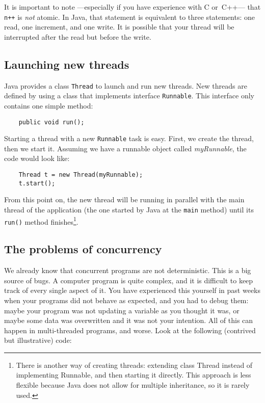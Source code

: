 It is important to note ---especially if you have experience with C
or~C++--- that \verb_n++_ is \emph{not} atomic. In Java, that
statement is equivalent to three statements: one read, one increment,
and one write. It is possible that your thread will be interrupted
after the read but before the write. 

\subsection{Launching new threads}
\label{sec:launch-new-thre}

Java provides a class \verb+Thread+ to launch and run new threads. New
threads are defined by using a class that implements interface
\verb+Runnable+. This interface only contains one simple method: 

\begin{verbatim}
    public void run();
\end{verbatim}

Starting a thread with a new \verb+Runnable+ task is easy. First, we
create the thread, then we start it. Assuming we have a runnable
object called \emph{myRunnable}, the code would look like:

\begin{verbatim}
    Thread t = new Thread(myRunnable);
    t.start();
\end{verbatim}

From this point on, the new thread will be running in parallel with
the main thread of the application (the one started by Java at the
\verb+main+ method) until its \verb+run()+ method
finishes\footnote{There is another way of creating threads: extending
  class Thread instead of implementing Runnable, and then starting it
  directly. This approach is less flexible because Java 
  does not allow for multiple inheritance, so it is rarely used.}. 

\subsection{The problems of concurrency}
\label{sec:problems-concurrency}

We already know that concurrent programs are not deterministic. This
is a big source of bugs. A computer program is quite complex, and it
is difficult to keep track of every single aspect of it. You have
experienced this yourself in past weeks when your programs did not
behave as expected, and you had to debug them: maybe your program was
not updating a variable as you thought it was, or maybe some data was
overwritten and it was not your intention. All of this can happen in
multi-threaded programs, and worse. Look at the following (contrived
but illustrative) code: 

